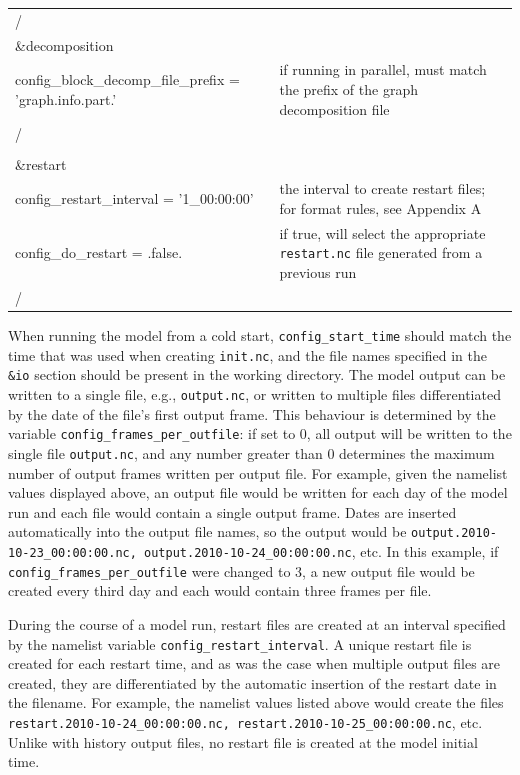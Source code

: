 \documentclass[11pt]{report}
\begin{document}
\begin{longtable}{p{3.0in} |p{3.25in}}
/ 
\\
\&decomposition                                            & \\
   config\_block\_decomp\_file\_prefix = 'graph.info.part.' & if running in parallel, must match the prefix of the graph decomposition file \\
/                                                    & \\
\\
\&restart                                            & \\
   config\_restart\_interval = '1\_00:00:00'         & the interval to create restart files; for format rules, see Appendix A \\
   config\_do\_restart = .false.                     & if true, will select the appropriate {\tt restart.nc} file generated from a previous run \\
/ 
\end{longtable}

When running the model from a cold start, {\tt config\_start\_time} should match the time that was used when creating {\tt init.nc}, and the file names specified in the {\tt \&io} section should be present in the working directory.  The model output can be written to a single file, e.g., {\tt output.nc}, or written to multiple files differentiated by the date of the file's first output frame.  This behaviour is determined by the variable {\tt config\_frames\_per\_outfile}: if set to 0, all output will be written to the single file {\tt output.nc}, and any number greater than 0 determines the maximum number of output frames written per output file.  For example, given the namelist values displayed above, an output file would be written for each day of the model run and each file would contain a single output frame.  Dates are inserted automatically into the output file names, so the output would be {\tt output.2010-10-23\_00:00:00.nc, output.2010-10-24\_00:00:00.nc}, etc.  In this example, if {\tt config\_frames\_per\_outfile} were changed to 3, a new output file would be created every third day and each would contain three frames per file.

During the course of a model run, restart files are created at an interval specified by the namelist variable {\tt config\_restart\_interval}.  A unique restart file is created for each restart time, and as was the case when multiple output files are created, they are differentiated by the automatic insertion of the restart date in the filename.  For example, the namelist values listed above would create the files {\tt restart.2010-10-24\_00:00:00.nc, restart.2010-10-25\_00:00:00.nc}, etc. Unlike with history output files, no restart file is created at the model initial time.
\end{document}
